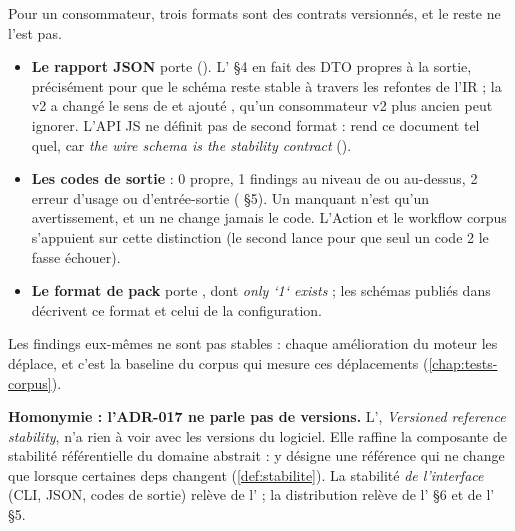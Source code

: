 Pour un consommateur, trois formats sont des contrats versionnés, et le reste ne l'est pas.
\begin{itemize}
  \item \textbf{Le rapport JSON} porte  (). L' §4 en fait des DTO propres à la sortie, précisément pour que le schéma reste stable à travers les refontes de l'IR ; la v2 a changé le sens de  et ajouté , qu'un consommateur v2 plus ancien peut ignorer. L'API JS ne définit pas de second format :  rend ce document tel quel, car \og \emph{the wire schema is the stability contract}\fg{} ().
  \item \textbf{Les codes de sortie} : 0 propre, 1 findings au niveau de  ou au-dessus, 2 erreur d'usage ou d'entrée-sortie ( §5). Un  manquant n'est qu'un avertissement, et un \Info{} ne change jamais le code. L'Action et le workflow corpus s'appuient sur cette distinction (le second lance  pour que seul un code 2 le fasse échouer).
  \item \textbf{Le format de pack} porte , dont \og \emph{only `1` exists}\fg{} ; les schémas publiés dans  décrivent ce format et celui de la configuration.
\end{itemize}
Les findings eux-mêmes ne sont pas stables : chaque amélioration du moteur les déplace, et c'est la baseline du corpus qui mesure ces déplacements (\cref{chap:tests-corpus}).

\begin{piege}
\textbf{Homonymie : l'ADR-017 ne parle pas de versions.}
L', \og \emph{Versioned reference stability}\fg{}, n'a rien à voir avec les versions du logiciel. Elle raffine la composante de stabilité référentielle du domaine abstrait :  y désigne une référence qui ne change que lorsque certaines deps changent (\cref{def:stabilite}). La stabilité \emph{de l'interface} (CLI, JSON, codes de sortie) relève de l' ; la distribution relève de l' §6 et de l' §5.
\end{piege}

